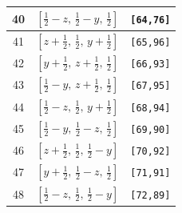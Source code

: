 \documentclass[fleqn,8pt]{jsarticle}
\begin{document}
\begin{longtable}{ccc}
40 & $\left[ \frac{1}{2} - z,\, \frac{1}{2} - y,\, \frac{1}{2} \right]$ & {\tt [64,76]} \\ \hline
41 & $\left[ z + \frac{1}{2},\, \frac{1}{2},\, y + \frac{1}{2} \right]$ & {\tt [65,96]} \\ \hline
42 & $\left[ y + \frac{1}{2},\, z + \frac{1}{2},\, \frac{1}{2} \right]$ & {\tt [66,93]} \\ \hline
43 & $\left[ \frac{1}{2} - y,\, z + \frac{1}{2},\, \frac{1}{2} \right]$ & {\tt [67,95]} \\ \hline
44 & $\left[ \frac{1}{2} - z,\, \frac{1}{2},\, y + \frac{1}{2} \right]$ & {\tt [68,94]} \\ \hline
45 & $\left[ \frac{1}{2} - y,\, \frac{1}{2} - z,\, \frac{1}{2} \right]$ & {\tt [69,90]} \\ \hline
46 & $\left[ z + \frac{1}{2},\, \frac{1}{2},\, \frac{1}{2} - y \right]$ & {\tt [70,92]} \\ \hline
47 & $\left[ y + \frac{1}{2},\, \frac{1}{2} - z,\, \frac{1}{2} \right]$ & {\tt [71,91]} \\ \hline
48 & $\left[ \frac{1}{2} - z,\, \frac{1}{2},\, \frac{1}{2} - y \right]$ & {\tt [72,89]} \\
\end{longtable}
\renewcommand{\arraystretch}{1.2}
\end{document}
